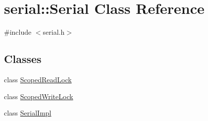 \hypertarget{classserial_1_1_serial}{}\section{serial\+:\+:Serial Class Reference}
\label{classserial_1_1_serial}


{\ttfamily \#include $<$serial.\+h$>$}

\subsection*{Classes}
\begin{DoxyCompactItemize}
\item 
class \hyperlink{classserial_1_1_serial_1_1_scoped_read_lock}{Scoped\+Read\+Lock}
\item 
class \hyperlink{classserial_1_1_serial_1_1_scoped_write_lock}{Scoped\+Write\+Lock}
\item 
class \hyperlink{classserial_1_1serial_1_1_serial_1_1_serial_impl}{Serial\+Impl}
\end{DoxyCompactItemize}
